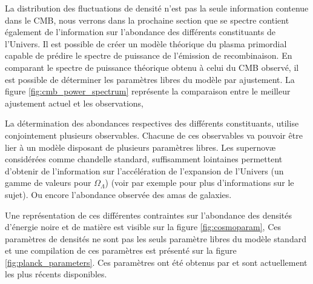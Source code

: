 La distribution des fluctuations de densité n'est pas la seule information contenue dans le \ac{CMB}, nous verrons dans la prochaine section que se spectre contient également de l'information sur l'abondance des différents constituants de l'Univers.
Il est possible de créer un modèle théorique du plasma primordial capable de prédire le spectre de puissance de l'émission de recombinaison.
En comparant le spectre de puissance théorique obtenu à celui du \ac{CMB} observé, il est possible de déterminer les paramètres libres du modèle par ajustement.
La figure \ref{fig:cmb_power_spectrum} représente la comparaison entre le meilleur ajustement actuel et les observations, 

La détermination des abondances respectives des différents constituants, utilise conjointement plusieurs observables.
Chacune de ces observables va pouvoir être lier à un modèle disposant de plusieurs paramètres libres.
Les supernovæ considérées comme chandelle standard, suffisamment lointaines permettent d'obtenir de l'information sur l'accélération de l'expansion de l'Univers (un gamme de valeurs pour $\Omega_\Lambda$) (voir par exemple \cite{1999ApJ...517..565P} pour plus d'informations sur le sujet).
Ou encore l'abondance observée des amas de galaxies.



Une représentation de ces différentes contraintes sur l'abondance des densités d'énergie noire et de matière est visible sur la figure \ref{fig:cosmoparam},
Ces paramètres de densités ne sont pas les seuls paramètre libres du modèle standard et une compilation de ces paramètres est présenté sur la figure \ref{fig:planck_parameters}.
Ces paramètres ont été obtenus par \cite{planck_collaboration_planck_2016} et sont actuellement les plus récents disponibles.

